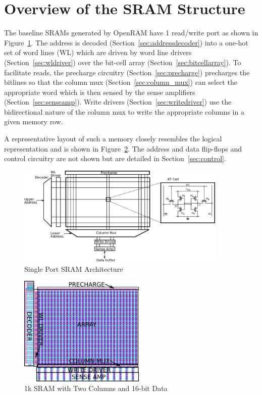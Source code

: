 \section{Overview of the SRAM Structure}
\label{sec:overview}


The baseline SRAMs generated by OpenRAM have 1 read/write port as
shown in Figure~\ref{fig:sram_architecture}. The address is decoded
(Section~\ref{sec:addressdecoder}) into a one-hot set of word lines
(WL) which are driven by word line drivers
(Section~\ref{sec:wldriver}) over the bit-cell array
(Section~\ref{sec:bitcellarray}). To facilitate reads, the precharge
circuitry (Section~\ref{sec:precharge}) precharges the bitlines so
that the column mux (Section~\ref{sec:column_mux}) can select the
appropriate word which is then sensed by the sense amplifiers
(Section~\ref{sec:senseamp}).  Write drivers
(Section~\ref{sec:writedriver}) use the bidirectional nature of the
column mux to write the appropriate columns in a given memory row.

A representative layout of such a memory closely resembles the logical
representation and is shown in Figure~\ref{fig:layout_view}.  The
address and data flip-flops and control circuitry are not shown but
are detailed in Section~\ref{sec:control}.


\begin{figure}[htb]
\centering
\includegraphics[width=10cm]{./figs/sram_overview.pdf}
\caption{Single Port SRAM Architecture}
\label{fig:sram_architecture}
\end{figure}


\begin{figure}[htb]
\centering
\includegraphics[width=6cm]{./figs/layout_view_1024_16_annotated.pdf}
\caption{1k SRAM with Two Columns and 16-bit Data}
\label{fig:layout_view}
\end{figure}



